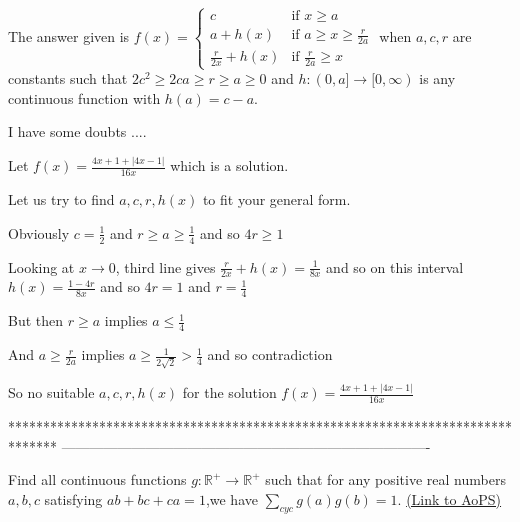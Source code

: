 \begin{solution}
	\begin{tcolorbox}The answer given is $ f(x) =\begin{cases}c &\mbox{if }x\geq a\\ a+h(x) &\mbox{if }a\geq x\geq\frac{r}{2a}\\ \frac{r}{2x}+h(x) &\mbox{if }\frac{r}{2a}\geq x\end{cases} $ when $a,c,r$ are constants such that $2c^2 \ge 2ca \ge r \ge a \ge 0$ and $h: (0,a] \to [0, \infty)$ is any continuous function with $h(a)=c-a$.\end{tcolorbox}
I have some doubts ....

Let $f(x)=\frac{4x+1+|4x-1|}{16x}$ which is a solution.

Let us try to find $a,c,r,h(x)$ to fit your general form.

Obviously $c=\frac 12$ and $r\ge a\ge \frac 14$ and so $4r\ge 1$

Looking at $x\to 0$, third line gives $\frac r{2x}+h(x)=\frac 1{8x}$ and so on this interval $h(x)=\frac{1-4r}{8x}$  and so $4r=1$ and $r=\frac 14$

But then $r\ge a$ implies $a\le \frac 14$

And $a\ge\frac r{2a}$ implies $a\ge\frac 1{2\sqrt 2}>\frac 14$ and so contradiction

So no suitable $a,c,r,h(x)$ for the solution $f(x)=\frac{4x+1+|4x-1|}{16x}$
\end{solution}
*******************************************************************************
-------------------------------------------------------------------------------

\begin{problem}
	Find all continuous functions $g:\mathbb{R^{+}}\rightarrow\mathbb{R^{+}}$ such that for any
positive real numbers $a,b,c$ satisfying $ab+bc+ca=1$,we have $\sum_{cyc}g(a)g(b)=1$.
	\flushright \href{https://artofproblemsolving.com/community/c6h476687}{(Link to AoPS)}
\end{problem}



